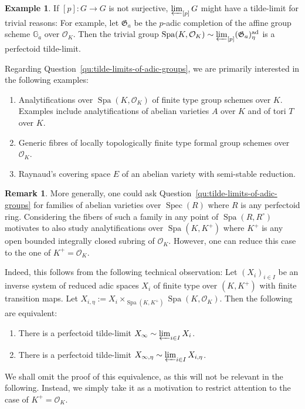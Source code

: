 \documentclass[10pt,oneside]{amsart}
\theoremstyle{definition}
\newtheorem{remark}[theorem]{Remark}
\newtheorem{example}[theorem]{Example}
\newcommand{\Spec}{\operatorname{Spec}}
\newcommand{\Spa}{\operatorname{Spa}}
\newcommand{\ad}{\mathrm{ad}}
\renewcommand{\O}{\mathcal{O}}
\begin{document}
\begin{example}
	If $[p]:G\to G$ is not surjective, $\varprojlim_{[p]}G$ might have a tilde-limit for trivial reasons: For example, let $\mathfrak G_a$  be the $p$-adic completion of the affine group scheme $\mathbb G_a$ over $\mathcal O_K$. Then the trivial group $\operatorname{Spa}(K,\mathcal O_K)\sim \varprojlim_{[p]}(\mathfrak G_a)^{\ad}_{\eta}$ is a perfectoid tilde-limit.
\end{example}

Regarding Question~\ref{qu:tilde-limits-of-adic-groups}, we are primarily interested in the following examples:
\begin{enumerate}	 
	\item Analytifications over $\Spa(K,\O_K)$ of finite type group schemes over $K$. Examples include analytifications of abelian varieties $A$ over $K$ and of tori $T$ over $K$.
	\item Generic fibres of locally topologically finite type formal group schemes over $\mathcal O_K$.
	\item Raynaud's covering space $E$  of an abelian variety with semi-stable reduction.
\end{enumerate}
\begin{remark}
	More generally, one could ask Question~\ref{qu:tilde-limits-of-adic-groups} for families of abelian varieties over $\Spec(R)$ where $R$ is any perfectoid ring. Considering the fibers of such a family in any point of $\Spa(R,R^\circ)$ motivates to also study analytifications over $\Spa(K,K^+)$ where $K^+$ is any open bounded integrally closed subring of $\O_K$. However, one can reduce this case to the one of $K^+=\O_K$.
	
	Indeed, this follows from the following technical observation:
	Let $(X_i)_{i\in I}$ be an inverse system of reduced adic spaces $X_i$ of finite type over $(K,K^+)$ with finite transition maps. Let $X_{i,\eta}:=X_i\times_{\Spa(K,K^+)}\Spa(K,\mathcal O_K)$. Then the following are equivalent: 
	\begin{enumerate}
	\item There is a perfectoid tilde-limit $X_{\infty}\sim \varprojlim_{i \in I}X_{i}$. 
	\item There is a perfectoid tilde-limit $X_{\infty,\eta}\sim \varprojlim_{i \in I}X_{i,\eta}$.
	\end{enumerate}

We shall omit the proof of this equivalence, as this will not be relevant in the following. Instead, we simply take it as a motivation to restrict attention to the case of  $K^+=\O_K$.
\end{remark}
\end{document}
